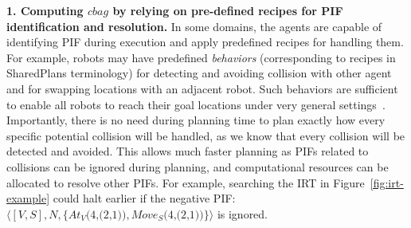\documentclass[11pt]{article}
\newcommand{\move}[3]{\textit{Move$_{#1}$(#2,#3)}}
\newcommand{\at}[3]{\textit{At$_{#1}$(#2,#3)}}
\begin{document}
{\bf 1. Computing $cbag$ by relying on pre-defined recipes for PIF identification and resolution.} 
In some domains, the agents are capable of identifying PIF during execution and apply predefined recipes for handling them. 
For example, robots may have predefined {\em behaviors} (corresponding to recipes in SharedPlans terminology) for detecting and avoiding collision with other agent and for swapping locations with an adjacent robot. Such behaviors are sufficient to enable all robots to reach their goal locations under very general settings~\cite{wang2009tractable,snape2011hybrid,de2013push}. Importantly, there is no need during planning time to plan exactly how every specific potential collision will be handled, as we know that every collision will be detected and avoided. This allows much faster planning as PIFs related to collisions can be ignored during planning, and computational resources can be allocated to resolve other PIFs. For example, searching the IRT in Figure~\ref{fig:irt-example} could halt earlier if the negative PIF: $\langle [V,S], N, \{ \at{V}{4}{(2,1)}, \move{S}{4}{(2,1)} \} \rangle$ is ignored.


\end{document}
